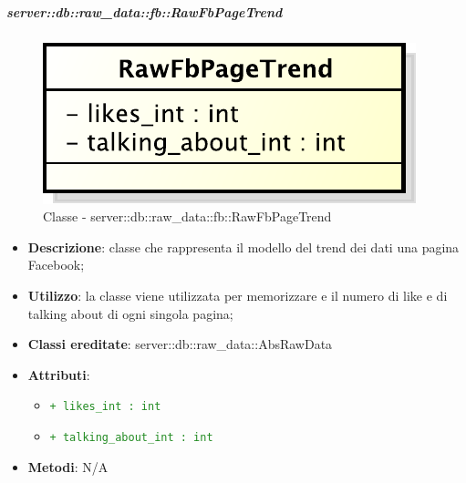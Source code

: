 			\subparagraph{server::db::raw\_data::fb::RawFbPageTrend} %
			\label{subp:server_db_raw_data_fb_rowfbpagetrend}
				\begin{figure}[htbp]
					\centering
					\centerline{\includegraphics[scale=0.75]{./images/server/classes/db/raw_fb_page_trend.pdf}}
					\caption{Classe - server::db::raw\_data::fb::RawFbPageTrend}
				\end{figure}
				\begin{itemize}
					\item \textbf{Descrizione}: classe che rappresenta il modello del trend dei dati una pagina Facebook;
					\item \textbf{Utilizzo}: la classe viene utilizzata per memorizzare e il numero di like e di talking about di ogni singola pagina;
					\item \textbf{Classi ereditate}: server::db::raw\_data::AbsRawData
					\item \textbf{Attributi}:
					\begin{itemize}
						\item \textcolor{forestgreen}{\texttt{+ likes\_int : int}}
						\item \textcolor{forestgreen}{\texttt{+ talking\_about\_int : int}}
					\end{itemize}
					\item \textbf{Metodi}: N/A
				\end{itemize}


